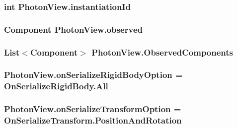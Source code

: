 \subsubsection[{\texorpdfstring{instantiation\+Id}{instantiationId}}]{\setlength{\rightskip}{0pt plus 5cm}int Photon\+View.\+instantiation\+Id}\hypertarget{class_photon_view_aa32a59c1f2bd619673142ab75fc7c928}{}\label{class_photon_view_aa32a59c1f2bd619673142ab75fc7c928}
\subsubsection[{\texorpdfstring{observed}{observed}}]{\setlength{\rightskip}{0pt plus 5cm}Component Photon\+View.\+observed}\hypertarget{class_photon_view_a7429864925f0716b072e8a7c4b23c59b}{}\label{class_photon_view_a7429864925f0716b072e8a7c4b23c59b}
\subsubsection[{\texorpdfstring{Observed\+Components}{ObservedComponents}}]{\setlength{\rightskip}{0pt plus 5cm}List$<$Component$>$ Photon\+View.\+Observed\+Components}\hypertarget{class_photon_view_ae0c6ba75b4b849f41a2164c0ad7dbf8f}{}\label{class_photon_view_ae0c6ba75b4b849f41a2164c0ad7dbf8f}
\subsubsection[{\texorpdfstring{on\+Serialize\+Rigid\+Body\+Option}{onSerializeRigidBodyOption}}]{ Photon\+View.\+on\+Serialize\+Rigid\+Body\+Option = {\bf On\+Serialize\+Rigid\+Body.\+All}}\hypertarget{class_photon_view_a57eb2e5b6b3aea9e4ac6cc494dc19a27}{}\label{class_photon_view_a57eb2e5b6b3aea9e4ac6cc494dc19a27}
\subsubsection[{\texorpdfstring{on\+Serialize\+Transform\+Option}{onSerializeTransformOption}}]{ Photon\+View.\+on\+Serialize\+Transform\+Option = {\bf On\+Serialize\+Transform.\+Position\+And\+Rotation}}\hypertarget{class_photon_view_a72f924cef0d24da2c542e80062cc3934}{}\label{class_photon_view_a72f924cef0d24da2c542e80062cc3934}
